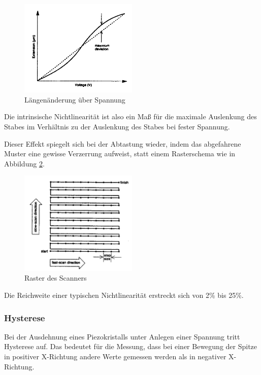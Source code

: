 \begin{figure}
	\centering
		\includegraphics[width=0.5\textwidth]{nichtlinearitat.png}
	\caption{Längenänderung über Spannung}
	\label{fig:nichtlinearität}
\end{figure}

\noindent Die intrinsische Nichtlinearität ist also ein Maß für die maximale Auslenkung des Stabes im Verhältnis zu der Auslenkung des Stabes bei fester Spannung. 

\noindent Dieser Effekt spiegelt sich bei der Abtastung wieder, indem das abgefahrene Muster eine gewisse Verzerrung aufweist, statt einem Rasterschema wie in Abbildung \ref{fig:raster}.

\begin{figure}
	\centering
		\includegraphics[width=0.5\textwidth]{raster.png}
	\caption{Raster des Scanners}
	\label{fig:raster}
\end{figure}

\noindent Die Reichweite einer typischen Nichtlinearität erstreckt sich von 2\% bis 25\%.

\subsubsection{Hysterese}
Bei der Ausdehnung eines Piezokristalls unter Anlegen einer Spannung tritt Hysterese auf.
Das bedeutet für die Messung, dass bei einer Bewegung der Spitze in positiver X-Richtung andere Werte gemessen werden als in negativer X-Richtung.

